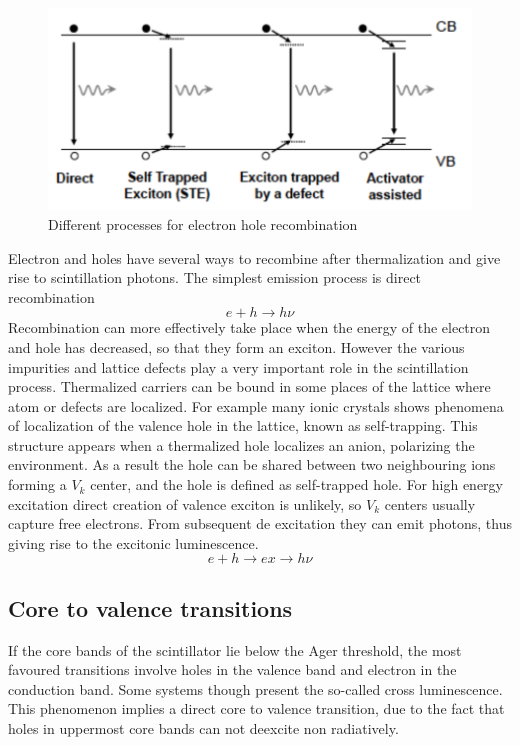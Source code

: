 \begin{figure}
\centering
\includegraphics[width=12cm]{../Pictures/Chapter_2/traps.pdf}
\caption[Electron hole recombination]{Different processes for electron hole recombination}
\label{fig:traps}
\end{figure}
Electron and holes have several ways to recombine after thermalization and give rise to scintillation photons.
The simplest emission process is direct recombination
\begin{equation}
e + h \rightarrow h\nu
\end{equation}
Recombination can more effectively take place when the energy of the electron and hole has decreased, so that they form an exciton. 
However the various impurities and lattice defects play a very important role in the scintillation process. Thermalized carriers can be bound in some places of the lattice where atom or defects are localized. 
For example many ionic crystals shows phenomena of localization of the valence hole in the lattice, known as self-trapping. This structure appears when a thermalized hole localizes an anion, polarizing the environment. As a result the hole can be shared between two neighbouring ions forming a $V_{k}$ center, and the hole is defined as self-trapped hole. For high energy excitation direct creation of valence exciton is unlikely, so $V_{k}$ centers usually capture free electrons. From subsequent de excitation they can emit photons, thus giving rise to the excitonic luminescence.
\begin{equation} 
e + h \rightarrow ex \rightarrow h\nu
\end{equation}

\subsection{Core to valence transitions}

If the core bands of the scintillator lie below the Ager threshold, the most favoured transitions involve holes in the valence band and electron in the conduction band. Some systems though present the so-called cross luminescence. This phenomenon implies a direct core to valence transition, due to the fact that holes in uppermost core bands can not deexcite non radiatively\cite{Lecoq2006}. 

